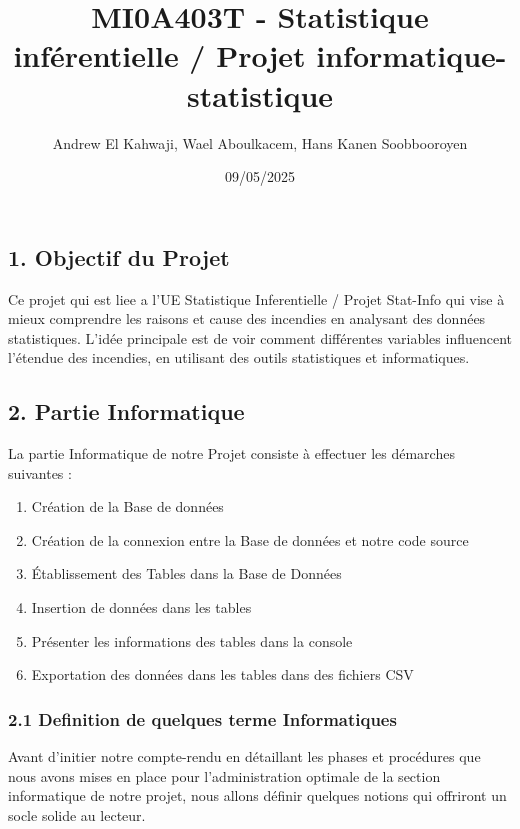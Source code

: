 \documentclass[
]{article}
\title{MI0A403T - Statistique inférentielle / Projet
informatique-statistique}
\author{Andrew El Kahwaji, Wael Aboulkacem, Hans Kanen Soobbooroyen}
\date{09/05/2025}
\providecommand{\tightlist}{%
  \setlength{\itemsep}{0pt}\setlength{\parskip}{0pt}}
\begin{document}
\maketitle

{
\setcounter{tocdepth}{3}
\tableofcontents
}
\subsection{1. Objectif du Projet}\label{objectif-du-projet}

Ce projet qui est liee a l'UE Statistique Inferentielle / Projet
Stat-Info qui vise à mieux comprendre les raisons et cause des incendies
en analysant des données statistiques. L'idée principale est de voir
comment différentes variables influencent l'étendue des incendies, en
utilisant des outils statistiques et informatiques.

\subsection{2. Partie Informatique}\label{partie-informatique}

La partie Informatique de notre Projet consiste à effectuer les
démarches suivantes :

\begin{enumerate}
\def\labelenumi{\arabic{enumi}.}
\tightlist
\item
  Création de la Base de données
\item
  Création de la connexion entre la Base de données et notre code source
\item
  Établissement des Tables dans la Base de Données
\item
  Insertion de données dans les tables
\item
  Présenter les informations des tables dans la console
\item
  Exportation des données dans les tables dans des fichiers CSV
\end{enumerate}

\subsubsection{2.1 Definition de quelques terme
Informatiques}\label{definition-de-quelques-terme-informatiques}

Avant d'initier notre compte-rendu en détaillant les phases et
procédures que nous avons mises en place pour l'administration optimale
de la section informatique de notre projet, nous allons définir quelques
notions qui offriront un socle solide au lecteur.
\end{document}
